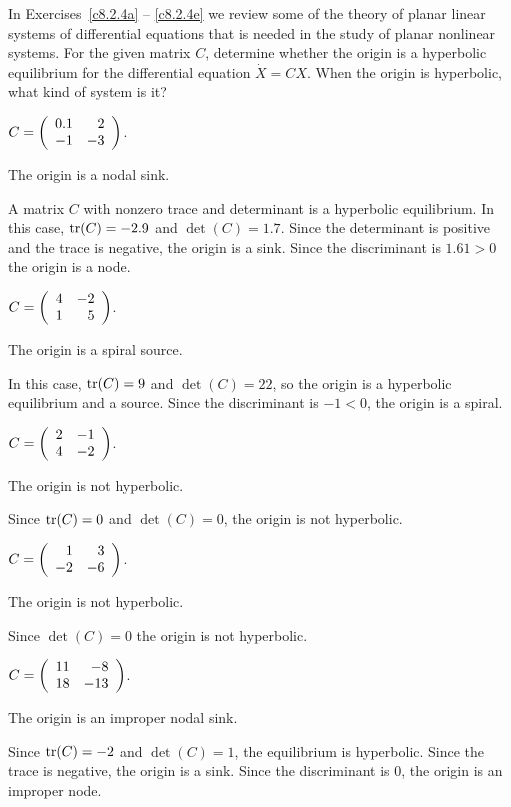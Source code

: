 \documentclass{ximera}
\begin{document}
\noindent In Exercises~\ref{c8.2.4a} -- \ref{c8.2.4e} we review some
of the theory of planar linear systems of differential equations that
is needed in the study of planar nonlinear systems.  For the given 
matrix $C$, determine whether the origin is a hyperbolic equilibrium 
for the differential equation $\dot{X}=CX$.  When the origin is 
hyperbolic, what kind of system is it?
\begin{exercise} \label{c8.2.4a}
$C=\left(\begin{array}{rr} 0.1 & 2\\ -1 &-3\end{array}\right)$. 

\begin{solution}
\ans The origin is a nodal sink.

\soln A matrix $C$ with nonzero trace and determinant is a hyperbolic
equilibrium.  In this case, ${\rm tr}(C) = -2.9$ and $\det(C) = 1.7$.
Since the determinant is positive and the trace is negative, the origin
is a sink. Since the discriminant is $1.61>0$ the origin is a node.

\end{solution}
\end{exercise}
\begin{exercise} \label{c8.2.4b}
$C=\left(\begin{array}{rr} 4 & -2\\ 1 &5\end{array}\right)$. 

\begin{solution}
\ans The origin is a spiral source.

\soln In this case, ${\rm tr}(C) = 9$ and $\det(C) = 22$, so the origin
is a hyperbolic equilibrium and a source.  Since the discriminant is 
$-1<0$, the origin is a spiral.

\end{solution}
\end{exercise}
\begin{exercise} \label{c8.2.4c}
$C=\left(\begin{array}{rr} 2 & -1\\ 4 &-2\end{array}\right)$. 

\begin{solution}
\ans The origin is not hyperbolic.

\soln Since ${\rm tr}(C) = 0$ and $\det(C) = 0$, the origin is not 
hyperbolic. 

\end{solution}
\end{exercise}
\begin{exercise} \label{c8.2.4d}
$C=\left(\begin{array}{rr} 1 & 3\\ -2 &-6\end{array}\right)$.

\begin{solution}
\ans The origin is not hyperbolic.

\soln Since $\det(C) = 0$ the origin is not hyperbolic.

\end{solution}
\end{exercise}
\begin{exercise} \label{c8.2.4e}
$C=\left(\begin{array}{rr} 11 & -8\\ 18 &-13\end{array}\right)$.

\begin{solution}
\ans The origin is an improper nodal sink.

\soln Since ${\rm tr}(C) = -2$ and $\det(C) = 1$, the equilibrium
is hyperbolic. Since the trace is negative, the origin is a sink.
Since the discriminant is $0$, the origin is an improper node. 

\end{solution}
\end{exercise}
\end{document}
